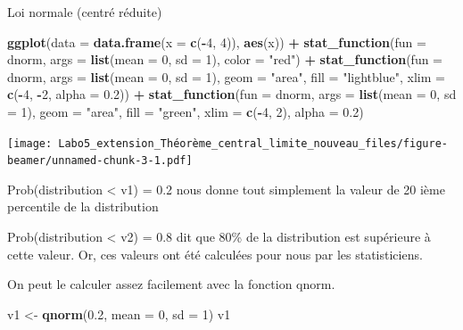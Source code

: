 \documentclass[ignorenonframetext,]{beamer}
\newenvironment{Shaded}{\begin{snugshade}}{\end{snugshade}}
\newcommand{\KeywordTok}[1]{\textcolor[rgb]{0.13,0.29,0.53}{\textbf{#1}}}
\newcommand{\DataTypeTok}[1]{\textcolor[rgb]{0.13,0.29,0.53}{#1}}
\newcommand{\DecValTok}[1]{\textcolor[rgb]{0.00,0.00,0.81}{#1}}
\newcommand{\FloatTok}[1]{\textcolor[rgb]{0.00,0.00,0.81}{#1}}
\newcommand{\StringTok}[1]{\textcolor[rgb]{0.31,0.60,0.02}{#1}}
\newcommand{\OperatorTok}[1]{\textcolor[rgb]{0.81,0.36,0.00}{\textbf{#1}}}
\newcommand{\NormalTok}[1]{#1}
\begin{document}
\begin{frame}[fragile]{Loi normale (centré réduite)}
\begin{Shaded}
\begin{Highlighting}[]
\KeywordTok{ggplot}\NormalTok{(}\DataTypeTok{data =} \KeywordTok{data.frame}\NormalTok{(}\DataTypeTok{x =} \KeywordTok{c}\NormalTok{(}\OperatorTok{-}\DecValTok{4}\NormalTok{, }\DecValTok{4}\NormalTok{)), }\KeywordTok{aes}\NormalTok{(x)) }\OperatorTok{+}
\StringTok{  }\KeywordTok{stat_function}\NormalTok{(}\DataTypeTok{fun =}\NormalTok{ dnorm, }\DataTypeTok{args =} \KeywordTok{list}\NormalTok{(}\DataTypeTok{mean =} \DecValTok{0}\NormalTok{, }\DataTypeTok{sd =} \DecValTok{1}\NormalTok{), }\DataTypeTok{color =} \StringTok{"red"}\NormalTok{) }\OperatorTok{+}
\StringTok{  }\KeywordTok{stat_function}\NormalTok{(}\DataTypeTok{fun =}\NormalTok{ dnorm, }\DataTypeTok{args =} \KeywordTok{list}\NormalTok{(}\DataTypeTok{mean =} \DecValTok{0}\NormalTok{, }\DataTypeTok{sd =} \DecValTok{1}\NormalTok{),}
                \DataTypeTok{geom =} \StringTok{"area"}\NormalTok{, }\DataTypeTok{fill =} \StringTok{"lightblue"}\NormalTok{, }\DataTypeTok{xlim =} \KeywordTok{c}\NormalTok{(}\OperatorTok{-}\DecValTok{4}\NormalTok{, }\OperatorTok{-}\DecValTok{2}\NormalTok{, }\DataTypeTok{alpha =} \FloatTok{0.2}\NormalTok{)) }\OperatorTok{+}
\StringTok{    }\KeywordTok{stat_function}\NormalTok{(}\DataTypeTok{fun =}\NormalTok{ dnorm, }\DataTypeTok{args =} \KeywordTok{list}\NormalTok{(}\DataTypeTok{mean =} \DecValTok{0}\NormalTok{, }\DataTypeTok{sd =} \DecValTok{1}\NormalTok{),}
                \DataTypeTok{geom =} \StringTok{"area"}\NormalTok{, }\DataTypeTok{fill =} \StringTok{"green"}\NormalTok{, }\DataTypeTok{xlim =} \KeywordTok{c}\NormalTok{(}\OperatorTok{-}\DecValTok{4}\NormalTok{, }\DecValTok{2}\NormalTok{), }\DataTypeTok{alpha =} \FloatTok{0.2}\NormalTok{)  }
\end{Highlighting}
\end{Shaded}

\texttt{[image: Labo5\_extension\_Théorème\_central\_limite\_nouveau\_files/figure-beamer/unnamed-chunk-3-1.pdf]}

Prob(distribution \textless{} v1) = 0.2 nous donne tout simplement la
valeur de 20 ième percentile de la distribution

Prob(distribution \textless{} v2) = 0.8 dit que 80\% de la distribution
est supérieure à cette valeur. Or, ces valeurs ont été calculées pour
nous par les statisticiens.

On peut le calculer assez facilement avec la fonction qnorm.

\begin{Shaded}
\begin{Highlighting}[]
\NormalTok{v1 <-}\StringTok{ }\KeywordTok{qnorm}\NormalTok{(}\FloatTok{0.2}\NormalTok{, }\DataTypeTok{mean =} \DecValTok{0}\NormalTok{, }\DataTypeTok{sd =} \DecValTok{1}\NormalTok{)}
\NormalTok{v1}
\end{Highlighting}
\end{Shaded}


\end{frame}
\end{document}
